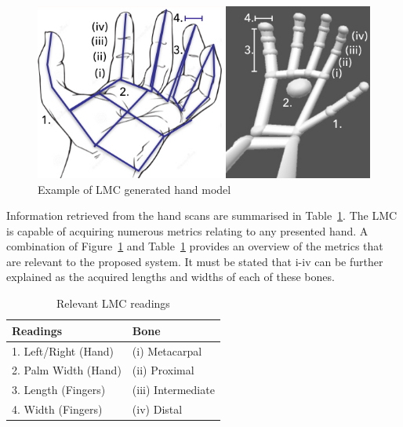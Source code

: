 
  
\begin{figure}[htbp!] 
\centering    
\includegraphics[width=1.0\textwidth]{Chapter2/Figs/Figure2-5.png}
\caption[Example of LMC generated hand model]{Example of LMC generated hand model}
\label{fig:Example_of_LMC_generated_hand_model}
\end{figure}

\begin{figure}
\centering
\def\svgwidth{\columnwidth}

\end{figure}



Information retrieved from the hand scans are summarised in Table~\ref{table: Relevant LMC readings}. The LMC is capable of acquiring numerous metrics relating to any presented hand. A combination of Figure~\ref{fig:Example_of_LMC_generated_hand_model} and Table~\ref{table: Relevant LMC readings} provides an overview of the metrics that are relevant to the proposed system. It must be stated that i-iv can be further explained as the acquired lengths and widths of each of these bones.

\begin{table}[h]
\caption{Relevant LMC readings}
\centering
 \begin{tabular}{|p{} | p{}|} 
 \hline
	\textbf{Readings} & \textbf{Bone} \\ [1ex] 
 \hline\hline 
 1.	Left/Right (Hand) & (i) Metacarpal \\[1ex]
 \hline 
 2.	Palm Width (Hand) & (ii) Proximal \\[1ex]
 \hline
 3.	Length (Fingers) & (iii) Intermediate \\ [1ex] 
 \hline
 4.	Width (Fingers) & (iv) Distal \\ [1ex] 
 \hline
 \end{tabular}
 \label{table: Relevant LMC readings}
\end{table}


